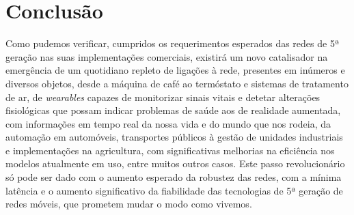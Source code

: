 \documentclass{llncs}
\begin{document}
\section{Conclusão}
Como pudemos verificar, cumpridos os requerimentos esperados das redes de 5ª geração nas suas implementações comerciais, existirá um novo catalisador na emergência de um quotidiano repleto de ligações à rede, presentes em inúmeros e diversos objetos, desde a máquina de café ao termóstato e sistemas de tratamento de ar, de \textit{wearables} capazes de monitorizar sinais vitais e detetar alterações fisiológicas que possam indicar problemas de saúde aos de realidade aumentada, com informações em tempo real da nossa vida e do mundo que nos rodeia, da automação em automóveis, transportes públicos à gestão de unidades industriais e implementações na agricultura, com significativas melhorias na eficiência nos modelos atualmente em uso, entre muitos outros casos. Este passo revolucionário só pode ser dado com o aumento esperado da robustez das redes, com a mínima latência e o aumento significativo da fiabilidade das tecnologias de 5ª geração de redes móveis, que prometem mudar o modo como vivemos.
\end{document}
